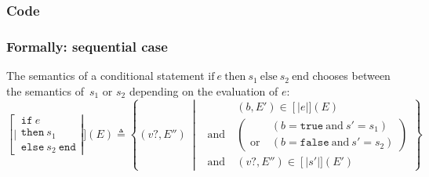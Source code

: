 \documentclass{book}
\newcommand\syntt[1]{\mathtt{#1}}
\newcommand\ife[3]{\text{if}\ #1\ \text{then}\ #2\ \text{else}\ #3\ \text{end}}
\newcommand\llbracket{[|}
\newcommand\rrbracket{|]}
\newcommand\interp[1]{\left\llbracket #1 \right\rrbracket}
\newcommand\st[0]{\ \middle|\ }
\begin{document}
  \subsubsection{Code}

  \subsubsection{Formally: sequential case}
  The semantics of a conditional statement $\ife{e}{s_1}{s_2}$ chooses between
  the semantics of~$s_1$ or $s_2$ depending on the evaluation of $e$:
  \begin{equation}
    \interp{\begin{array}{l}
      \syntt{if}\ e\\
      \syntt{then}\ s_1\\
      \syntt{else}\ s_2\ \syntt{end}
    \end{array}} (E) \triangleq
      \left\{ (v?, E'') \st{} \ 
      \begin{aligned}
        & (b, E') \in \interp{e} (E)
        \\ \text{and}\ &
        \left( \begin{aligned}
          & \left(b = \syntt{true} \ \text{and} \ s' = s_1 \right)
          \\ \text{or}\ &
          \left( b = \syntt{false} \ \text{and}\ s' = s_2 \right)
        \end{aligned} \right)
        \\ \text{and}\ &
        (v?, E'') \in \interp{s'} (E')
      \end{aligned}
      \right\}
    \label{eq:sem-det-scond}
  \end{equation}
\end{document}
